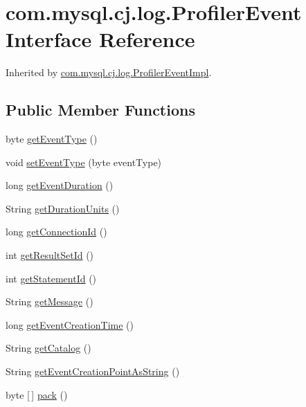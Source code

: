 \hypertarget{interfacecom_1_1mysql_1_1cj_1_1log_1_1_profiler_event}{}\section{com.\+mysql.\+cj.\+log.\+Profiler\+Event Interface Reference}
\label{interfacecom_1_1mysql_1_1cj_1_1log_1_1_profiler_event}


Inherited by \mbox{\hyperlink{classcom_1_1mysql_1_1cj_1_1log_1_1_profiler_event_impl}{com.\+mysql.\+cj.\+log.\+Profiler\+Event\+Impl}}.

\subsection*{Public Member Functions}
\begin{DoxyCompactItemize}
\item 
byte \mbox{\hyperlink{interfacecom_1_1mysql_1_1cj_1_1log_1_1_profiler_event_a5bc617e47a2d49ad356c17bd45f5be0d}{get\+Event\+Type}} ()
\item 
void \mbox{\hyperlink{interfacecom_1_1mysql_1_1cj_1_1log_1_1_profiler_event_a9d335a56c66afa440fce845f973e759e}{set\+Event\+Type}} (byte event\+Type)
\item 
long \mbox{\hyperlink{interfacecom_1_1mysql_1_1cj_1_1log_1_1_profiler_event_a82728ebce7920e4a0096f8135ec8336b}{get\+Event\+Duration}} ()
\item 
String \mbox{\hyperlink{interfacecom_1_1mysql_1_1cj_1_1log_1_1_profiler_event_aabb8272339aac8d5fd4985da51c93cd9}{get\+Duration\+Units}} ()
\item 
long \mbox{\hyperlink{interfacecom_1_1mysql_1_1cj_1_1log_1_1_profiler_event_ac1990bb68ea1968dc7c432523e822fab}{get\+Connection\+Id}} ()
\item 
int \mbox{\hyperlink{interfacecom_1_1mysql_1_1cj_1_1log_1_1_profiler_event_abe44cf020bbacb1e6c854de7cc8625c9}{get\+Result\+Set\+Id}} ()
\item 
int \mbox{\hyperlink{interfacecom_1_1mysql_1_1cj_1_1log_1_1_profiler_event_abe6c8708b242e58efb697d63c0b78a6d}{get\+Statement\+Id}} ()
\item 
String \mbox{\hyperlink{interfacecom_1_1mysql_1_1cj_1_1log_1_1_profiler_event_aebc12f64998b49e30c39a61e08f34a2c}{get\+Message}} ()
\item 
long \mbox{\hyperlink{interfacecom_1_1mysql_1_1cj_1_1log_1_1_profiler_event_aaadc6536f2576ccdc026fe5ad1d01ff0}{get\+Event\+Creation\+Time}} ()
\item 
String \mbox{\hyperlink{interfacecom_1_1mysql_1_1cj_1_1log_1_1_profiler_event_a234f6be623335bd2510e74220d71c526}{get\+Catalog}} ()
\item 
String \mbox{\hyperlink{interfacecom_1_1mysql_1_1cj_1_1log_1_1_profiler_event_a839ab93561623274644822815bbaf71f}{get\+Event\+Creation\+Point\+As\+String}} ()
\item 
byte \mbox{[}$\,$\mbox{]} \mbox{\hyperlink{interfacecom_1_1mysql_1_1cj_1_1log_1_1_profiler_event_ad360df515f55034065a78397e2db5269}{pack}} ()
\end{DoxyCompactItemize}
